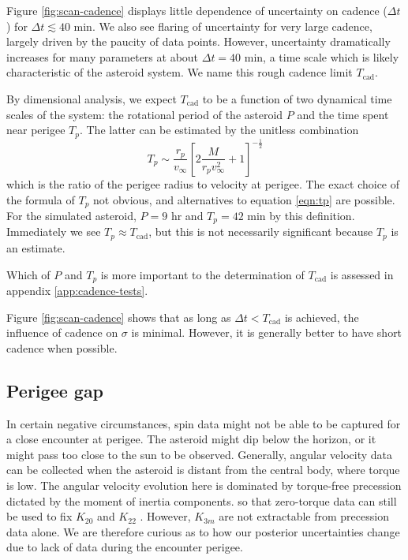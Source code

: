 \documentclass[fleqn,usenatbib]{mnras}
\newcommand{\brackets}[1]{\left[ #1 \right]}
\begin{document}
Figure \ref{fig:scan-cadence} displays little dependence of uncertainty on cadence ($\Delta t$) for $\Delta t \lesssim 40$ min. We also see flaring of uncertainty for very large cadence, largely driven by the paucity of data points. However, uncertainty dramatically increases for many parameters at about $\Delta t = 40$ min, a time scale which is likely characteristic of the asteroid system. We name this rough cadence limit $T_\text{cad}$.

By dimensional analysis, we expect $T_\text{cad}$ to be a function of two dynamical time scales of the system: the rotational period of the asteroid $P$ and the time spent near perigee $T_p$. The latter can be estimated by the unitless combination
\begin{equation}
  T_p \sim \frac{r_p}{v_\infty}\brackets{2\frac{M}{r_pv_\infty^2}+1}^{-\frac{1}{2}}
  \label{eqn:tp}
\end{equation}
which is the ratio of the perigee radius to velocity at perigee. The exact choice of the formula of $T_p$ not obvious, and alternatives to equation \ref{eqn:tp} are possible. For the simulated asteroid, $P = 9$ hr and $T_p = 42$ min by this definition. Immediately we see $T_p \approx T_\text{cad}$, but this is not necessarily significant because $T_p$ is an estimate.

Which of $P$ and $T_p$ is more important to the determination of $T_\text{cad}$ is assessed in appendix \ref{app:cadence-tests}.

Figure \ref{fig:scan-cadence} shows that as long as $\Delta t < T_\text{cad}$ is achieved, the influence of cadence on $\sigma$ is minimal. However, it is generally better to have short cadence when possible.



\subsection{Perigee gap}
\label{sec:scan-gap}
In certain negative circumstances, spin data might not be able to be captured for a close encounter at perigee. The asteroid might dip below the horizon, or it might pass too close to the sun to be observed. Generally, angular velocity data can be collected when the asteroid is distant from the central body, where torque is low. The angular velocity evolution here is dominated by torque-free precession dictated by the moment of inertia components. so that zero-torque data can still be used to fix $K_{20}$ and $K_{22}$ \cite{MOSKOVITZ2020113519}. However, $K_{3m}$ are not extractable from precession data alone. We are therefore curious as to how our posterior uncertainties change due to lack of data during the encounter perigee.
\end{document}
